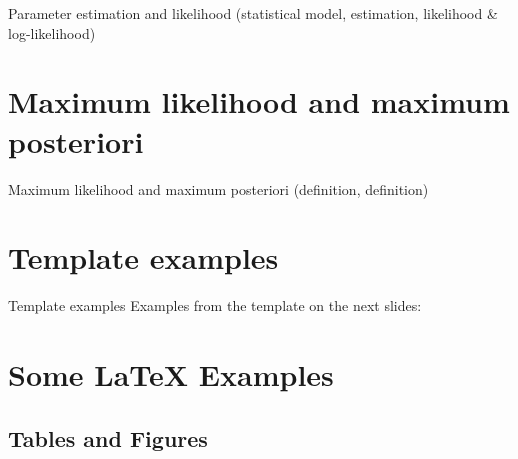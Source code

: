 \documentclass{beamer}
\begin{document}
\begin{frame}{Parameter estimation and likelihood}
  (statistical model, estimation, likelihood \& log-likelihood)
\end{frame}

\section{Maximum likelihood and maximum posteriori}

\begin{frame}{Maximum likelihood and maximum posteriori}
  (definition, definition)
\end{frame}

\section{Template examples}

\begin{frame}{Template examples}
  Examples from the template on the next slides:
\end{frame}

\section{Some \LaTeX{} Examples}

\subsection{Tables and Figures}
\end{document}
